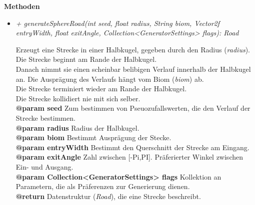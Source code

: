             \textbf{Methoden}
            \begin{itemize}
                \item  \textit{+ generateSphereRoad(int seed, float radius, String biom,
                Vector2f entryWidth, float exitAngle, Collection<GeneratorSettings> flags): Road}
                    \begin{leftbar}[0.9\linewidth]
                        Erzeugt eine Strecke in einer Halbkugel, gegeben durch den Radius (\textit{radius}).\\
                        Die Strecke beginnt am Rande der Halbkugel.\\
                        Danach nimmt sie einen scheinbar belibigen Verlauf innerhalb der Halbkugel an.
                        Die Ausprägung des Verlaufs hängt vom Biom (\textit{biom}) ab.\\
                        Die Strecke terminiert wieder am Rande der Halbkugel.\\
                        Die Strecke kollidiert nie mit sich selber.\\
                        \textbf{@param seed} Zum bestimmen von Pseuozufallswerten, die den Verlauf der Strecke bestimmen.\\
                        \textbf{@param radius} Radius der Halbkugel.\\
                        \textbf{@param biom} Bestimmt Ausprägung der Stecke.\\
                        \textbf{@param entryWidth} Bestimmt den Querschnitt der Strecke am Eingang.\\
                        \textbf{@param exitAngle} Zahl zwischen [-Pi,PI]. Präferierter Winkel zwischen Ein- und Ausgang.\\
                        \textbf{@param Collection<GeneratorSettings> flags} Kollektion an Parametern, die als Präferenzen zur Generierung dienen.\\
                        \textbf{@return} Datenstruktur (\textit{Road}), die eine Strecke beschreibt.
                    \end{leftbar}


\end{itemize}
